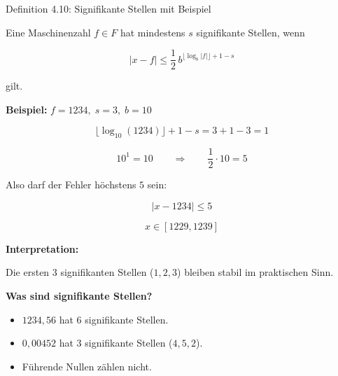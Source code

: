 \documentclass{beamer}
\begin{document}
\begin{frame}{Definition 4.10: Signifikante Stellen mit Beispiel}

\scriptsize

Eine Maschinenzahl \(f\in F\) hat mindestens \(s\) signifikante Stellen, wenn

\[
|x-f|\leq \frac12\, b^{\lfloor \log_b|f|\rfloor+1-s}
\]

gilt.

\vspace{0.2cm}
\textbf{Beispiel:} \(f=1234,\; s=3,\; b=10\)

\[
\lfloor \log_{10}(1234)\rfloor +1-s
=
3+1-3=1
\]

\[
10^1=10
\qquad\Rightarrow\qquad
\frac12\cdot 10=5
\]

Also darf der Fehler höchstens \(5\) sein:

\[
|x-1234|\leq 5
\]

\[
x\in[1229,1239]
\]

\vspace{0.2cm}

\textbf{Interpretation:}

Die ersten \(3\) signifikanten Stellen (\(1,2,3\)) bleiben stabil im
praktischen Sinn.

\vspace{0.2cm}

\textbf{Was sind signifikante Stellen?}

\begin{itemize}
\item \(1234{,}56\) hat \(6\) signifikante Stellen.
\item \(0{,}00452\) hat \(3\) signifikante Stellen (\(4,5,2\)).
\item Führende Nullen zählen nicht.
\end{itemize}

\end{frame}
\end{document}
